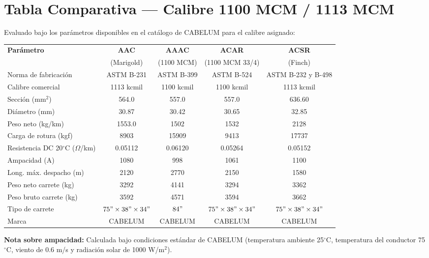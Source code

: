 \documentclass[12pt,a4paper]{article}
\begin{document}
\section{Tabla Comparativa --- Calibre 1100 MCM / 1113 MCM}

Evaluado bajo los parámetros disponibles en el catálogo de CABELUM para el
calibre asignado:

\begin{landscape}
\begin{center}
\begin{tabular}{p{4cm}c|c|c|c}
\toprule
\textbf{Parámetro} & \textbf{AAC} & \textbf{AAAC} & \textbf{ACAR} & \textbf{ACSR} \\
& (Marigold) & (1100 MCM) & (1100 MCM 33/4) & (Finch) \\
\midrule
Norma de fabricación & ASTM B-231 & ASTM B-399 & ASTM B-524 & ASTM B-232 y B-498 \\
\midrule
Calibre comercial & 1113 kcmil & 1100 kcmil & 1100 kcmil & 1113 kcmil \\
\midrule
Sección (mm$^2$) & 564.0 & 557.0 & 557.0 & 636.60 \\
\midrule
Diámetro (mm) & 30.87 & 30.42 & 30.65 & 32.85 \\
\midrule
Peso neto (kg/km) & 1553.0 & 1502 & 1532 & 2128 \\
\midrule
Carga de rotura (kgf) & 8903 & 15909 & 9413 & 17737 \\
\midrule
Resistencia DC 20$^\circ$C ($\Omega$/km) & 0.05112 & 0.06120 & 0.05264 & 0.05152 \\
\midrule
Ampacidad (A) & 1080 & 998 & 1061 & 1100 \\
\midrule
Long. máx. despacho (m) & 2120 & 2770 & 2150 & 1580 \\
\midrule
Peso neto carrete (kg) & 3292 & 4141 & 3294 & 3362 \\
\midrule
Peso bruto carrete (kg) & 3592 & 4571 & 3594 & 3662 \\
\midrule
Tipo de carrete & $75"\times38"\times34"$ & $84"$ & $75"\times38"\times34"$ & $75"\times38"\times34"$ \\
\midrule
Marca & CABELUM & CABELUM & CABELUM & CABELUM \\
\bottomrule
\end{tabular}
\end{center}

\vspace{0.3cm}
\textbf{Nota sobre ampacidad:} Calculada bajo condiciones estándar de CABELUM
(temperatura ambiente 25$^\circ$C, temperatura del conductor 75$^\circ$C,
viento de 0.6 m/s y radiación solar de 1000 W/m$^2$).
\end{landscape}
\end{document}
